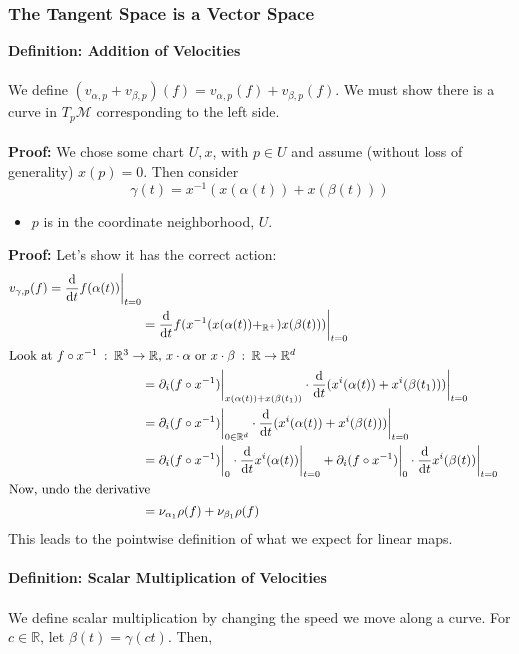 \documentclass[10pt]{article}
\newcommand{\R}{\mathbb{R}}
\begin{document}
\subsubsection*{The Tangent Space is a Vector Space}
\textbf{Definition: Addition of Velocities}\\\\
We define $(v_{\alpha, p} + v_{\beta, p})(f) = v_{\alpha, p}(f) + v_{\beta, p}(f)$.  We must show there is a curve in $T_p \mathcal{M}$ corresponding to the left side.\\\\
\textbf{Proof:}  We chose some chart $U, x$, with $p \in U$ and assume (without loss of generality) $x(p) = 0$.  Then consider
\[\gamma(t) = x^{-1}(x(\alpha(t)) + x(\beta(t)))\]
\begin{itemize}
    \item $p$ is in the coordinate neighborhood, $U$.
\end{itemize}
\textbf{Proof:}
Let's show it has the correct action:
\begin{align*}
    v_{\gamma, p} (f) = \frac{\text{d}}{\text{d}t} f(\alpha(t)) \bigg|_{t = 0} \\
    &= \frac{\text{d}}{\text{d}t} f(x^{-1}(x(\alpha(t)) +_{\mathbb{R}^+}) x(\beta(t)))\bigg|_{t = 0}\\
    \intertext{Look at $f \circ x^{-1}\::\: \R^3 \rightarrow \R$, $x \cdot \alpha$ or $x \cdot \beta \::\: \R \rightarrow \R^d$}
    &= \partial_i (f \circ x^{-1}) \bigg|_{x(\alpha(t)) + x(\beta(t_1))} \cdot \frac{\text{d}}{\text{d}t} (x^i (\alpha(t)) + x^i(\beta(t_1))) \bigg|_{t = 0}\\
    &= \partial_i (f \circ x^{-1}) \bigg|_{0 \in \mathbb{R}^d} \cdot \frac{\text{d}}{\text{d}t}(x^i(\alpha(t)) + x^i(\beta(t))) \bigg|_{t = 0}\\
    &= \partial_i (f \circ x^{-1}) \bigg|_{0} \cdot \frac{\text{d}}{\text{d}t} x^i(\alpha(t)) \bigg|_{t=0} + \partial_i (f \circ x^{-1}) \bigg|_0 \cdot \frac{\text{d}}{\text{d}t} x^i (\beta(t))\bigg|_{t=0}\\
    \intertext{Now, undo the derivative}
    &= \nu_{\alpha_1} \rho(f) + \nu_{\beta_1} \rho(f) 
\end{align*}
This leads to the pointwise definition of what we expect for linear maps.\\\\
\textbf{Definition: Scalar Multiplication of Velocities}\\\\
We define scalar multiplication by changing the speed we move along a curve.  For $c \in \R$, let $\beta(t) = \gamma(ct)$.  Then,
\end{document}
